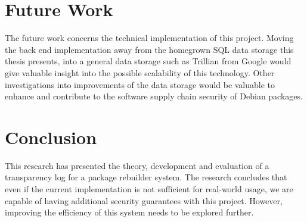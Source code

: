 \documentclass[../Main/thesis.tex]{subfiles}
\begin{document}
\section{Future Work}%
\label{sec:future_work}
The future work concerns the technical implementation of this project.
Moving the back end implementation away from the homegrown SQL data storage this
thesis presents, into a general data storage such as Trillian from Google would
give valuable insight into the possible scalability of this technology. Other
investigations into improvements of the data storage would be valuable to
enhance and contribute to the software supply chain security of Debian packages.


\section{Conclusion}%
\label{sec:conclusion_conclusion}
This research has presented the theory, development and evaluation of a
transparency log for a package rebuilder system. The research concludes that
even if the current implementation is not sufficient for real-world usage, we
are capable of having additional security guarantees with this project. However,
improving the efficiency of this system needs to be explored further.
\end{document}
